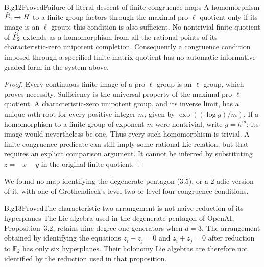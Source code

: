 \begin{claim}{B.g12}{Proved}{Failure of literal descent of finite congruence maps}
A homomorphism $\widehat F_2\to H$ to a finite group factors through the
maximal pro-$\ell$ quotient only if its image is an $\ell$-group;
this condition is also sufficient.  No nontrivial finite quotient of
$\widehat F_2$ extends as a homomorphism from all the rational points of its
characteristic-zero unipotent completion.  Consequently a congruence
condition imposed through a specified finite matrix quotient has no
automatic informative graded form in the system above.
\end{claim}

\begin{proof}
Every continuous finite image of a pro-$\ell$ group is an $\ell$-group,
which proves necessity.  Sufficiency is the universal property of the
maximal pro-$\ell$ quotient.  A characteristic-zero unipotent group,
and its inverse limit, has a unique $m$th root for every positive
integer $m$, given by $\exp((\log g)/m)$.
If a homomorphism to a finite group of exponent $m$ were nontrivial,
write $g=h^m$; its image would nevertheless be one.  Thus every such
homomorphism is trivial.  A finite congruence predicate can still imply
some rational Lie relation, but that requires an explicit comparison
argument.  It cannot be inferred by substituting $z=-x-y$ in the
original finite quotient.
\end{proof}

We found no map identifying the degenerate pentagon (3.5), or a
$2$-adic version of it, with one of Grothendieck's level-two or
level-four congruence conditions.

\begin{claim}{B.g13}{Proved}{The characteristic-two arrangement is not naive reduction of its hyperplanes}
The Lie algebra used in the degenerate pentagon of OpenAI,
Proposition~3.2, retains nine degree-one generators when $d=3$.
The arrangement obtained by identifying the equations
$z_i-z_j=0$ and $z_i+z_j=0$ after reduction to $\mathbb F_2$ has
only six hyperplanes.  Their holonomy Lie algebras are therefore
not identified by the reduction used in that proposition.
\end{claim}

